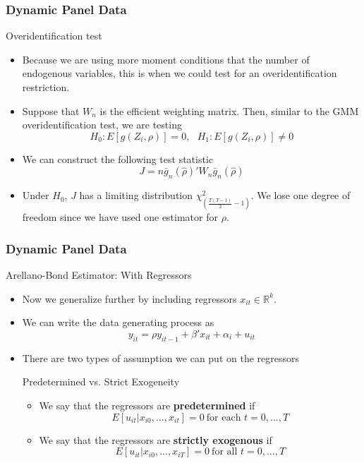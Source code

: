 \documentclass{beamer}
\begin{document}
\begin{frame}
\frametitle{Dynamic Panel Data}
Overidentification test
\begin{itemize}
\item Because we are using more moment conditions that the number of endogenous variables, this is when we could test for an overidentification restriction. 
\item Suppose that $W_n$ is the efficient weighting matrix. Then, similar to the GMM overidentification test, we are testing
\[
H_0: E[g(Z_i,\rho)]=0, \ \ \ H_1: E[g(Z_i,\rho)]\neq0
\]
\item We can construct the following test statistic
\[
J= n \bar{g}_n(\hat{\rho})'W_n\bar{g}_n(\hat{\rho})
\]
\item Under $H_0$, $J$ has a limiting distribution $\chi^2_{\left(\frac{T(T-1)}{2}-1\right)}$. We lose one degree of freedom since we have used one estimator for $\rho$. 
\end{itemize}
\end{frame}


\begin{frame}
\frametitle{Dynamic Panel Data}
Arellano-Bond Estimator: With Regressors
\begin{itemize}
\item Now we generalize further by including regressors $x_{it}\in\mathbb{R}^k$. 
\item We can write the data generating process as
\[
y_{it}=\rho y_{it-1}+\beta'x_{it}+\alpha_i + u_{it}
\]
\item There are two types of assumption we can put on the regressors
\begin{block}{Predetermined vs. Strict Exogeneity}
\begin{itemize}
\item We say that the regressors are \textbf{predetermined} if
\[
E[u_{it}|x_{i0},...,x_{it}]=0 \ \text{for each } t=0,...,T
\]
\item We say that the regressors are \textbf{strictly exogenous} if
\[
E[u_{it}|x_{i0},...,x_{iT}]=0 \ \text{for all } t=0,...,T
\]
\end{itemize}
\end{block}
\end{itemize}
\end{frame}
\end{document}
